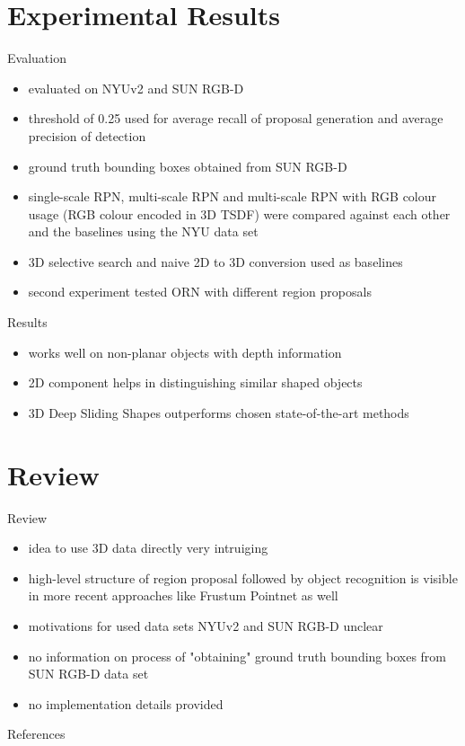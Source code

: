 \documentclass{beamer}
\begin{document}
\section{Experimental Results}
\begin{frame}{Evaluation}
    \begin{itemize}
        \item evaluated on NYUv2\cite{Silberman2012} and SUN RGB-D\cite{Song2015}
        \vfill
        \item threshold of 0.25 used for average recall of proposal generation and
              average precision of detection
        \vfill
        \item ground truth bounding boxes obtained from SUN RGB-D
        \vfill
        \item single-scale RPN, multi-scale RPN and multi-scale RPN with RGB colour
              usage (RGB colour encoded in 3D TSDF) were compared against each
              other and the baselines using the NYU data set
        \vfill
        \item 3D selective search and naive 2D to 3D conversion used as baselines
        \vfill
        \item second experiment tested ORN with different region proposals
    \end{itemize}
\end{frame}

\begin{frame}{Results}
    \begin{itemize}
        \item works well on non-planar objects with depth information
        \vfill
        \item 2D component helps in distinguishing similar shaped objects
        \vfill
        \item 3D Deep Sliding Shapes outperforms chosen state-of-the-art methods
    \end{itemize}
\end{frame}

\section{Review}
\begin{frame}{Review}
    \begin{itemize}
        \item idea to use 3D data directly very intruiging
        \vfill
        \item high-level structure of region proposal followed by object recognition
              is visible in more recent approaches like Frustum Pointnet\cite{Qi2017}
              as well
        \vfill
        \item motivations for used data sets NYUv2 and SUN RGB-D unclear
        \vfill
        \item no information on process of "obtaining" ground truth bounding boxes
              from SUN RGB-D data set
        \vfill
        \item no implementation details provided
    \end{itemize}
\end{frame}

\begin{frame}[allowframebreaks]{References}
    \printbibliography
\end{frame}
\end{document}
